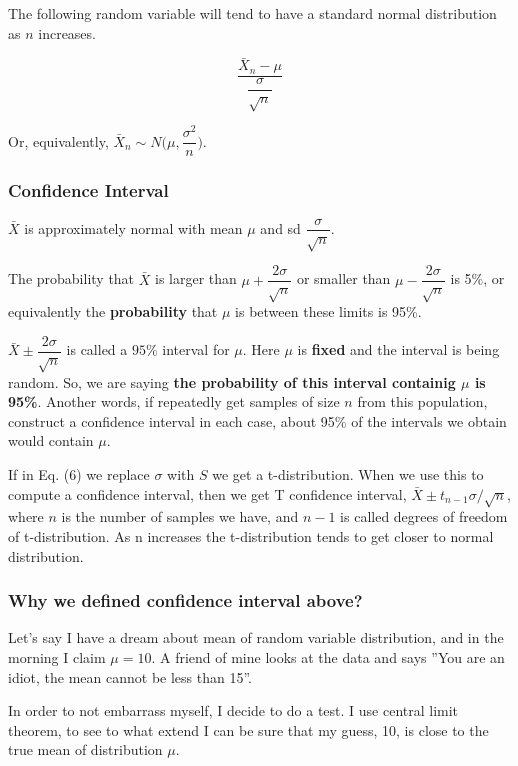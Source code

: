 \documentclass[11pt]{article}
\begin{document}
The following random variable will tend to have a standard normal
distribution as $n$ increases.

\[\dfrac{\bar{X}_n - \mu}{\dfrac{\sigma}{\sqrt{n}}} \tag{6}\]

Or, equivalently,
$\bar{X}_n \sim N\big(\mu, \dfrac{\sigma^2}{{n}}\big)$.

\subsubsection{Confidence Interval}\label{confidence-interval}

$\bar{X}$ is approximately normal with mean $\mu$ and sd
$\dfrac{\sigma}{\sqrt{n}}$.

The probability that $\bar{X}$ is larger than
$\mu + \dfrac{2\sigma}{\sqrt{n}}$ or smaller than
$\mu-\dfrac{2\sigma} {\sqrt{n}}$ is 5\%, or equivalently the
\textbf{probability} that $\mu$ is between these limits is 95\%.

$ \bar{X} \pm \dfrac{2\sigma}{\sqrt{n}}$ is called a $95\%$ interval
for $\mu$. Here $\mu$ is \textbf{fixed} and the interval is being
random. So, we are saying \textbf{the probability of this interval
containig $\mu$ is 95\%}. Another words, if repeatedly get samples of
size $n$ from this population, construct a confidence interval in each
case, about 95\% of the intervals we obtain would contain $\mu$.

If in Eq. (6) we replace $\sigma$ with $S$ we get a t-distribution.
When we use this to compute a confidence interval, then we get T
confidence interval, $ \bar{X} \pm t_{n-1}\sigma/\sqrt{n}$, where
$n$ is the number of samples we have, and $n-1$ is called degrees of
freedom of t-distribution. As n increases the t-distribution tends to
get closer to normal distribution.

    \subsubsection{Why we defined confidence interval
above?}\label{why-we-defined-confidence-interval-above}

Let's say I have a dream about mean of random variable distribution, and
in the morning I claim $\mu=10$. A friend of mine looks at the data
and says ''You are an idiot, the mean cannot be less than 15''.

In order to not embarrass myself, I decide to do a test. I use central
limit theorem, to see to what extend I can be sure that my guess, 10, is
close to the true mean of distribution $\mu$.
\end{document}
